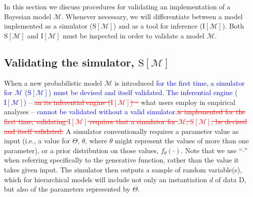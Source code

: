 \documentclass[oneside]{article}
\begin{document}
In this section we discuss procedures for validating an implementation of a Bayesian model $\mathcal{M}$.
Whenever necessary, we will differentiate between a model implemented as a simulator ($\text{S}[\mathcal{M}]$) and as a tool for inference ($\text{I}[\mathcal{M}]$).
Both $\text{S}[\mathcal{M}]$ and $\text{I}[\mathcal{M}]$ must be inspected in order to validate a model $\mathcal{M}$.

\subsection*{Validating the simulator, $\text{S}[\mathcal{M}]$}
\label{verify-correctness-of-simulator-implementation}

When a new probabilistic model $\mathcal{M}$ is introduced \textcolor{blue}{for the first time, a simulator for $\mathcal{M}$ ($\text{S}[\mathcal{M}]$) must be devised and itself validated.
The inferential engine ($\text{I}[\mathcal{M}]$) -- }\textcolor{red}{\st{an its inferential engine ($\text{I}[\mathcal{M}]$) -- }}what users employ in empirical analyses -- \textcolor{blue}{cannot be validated without a valid simulator.}\textcolor{red}{\st{is implemented for the first time, validating $\text{I}[\mathcal{M}]$ requires that a simulator for $\mathcal{M}$, $\text{S}[\mathcal{M}]$, be devised and itself validated.}}
A simulator conventionally requires a parameter value as input (i.e., a value for $\Theta$, $\theta$, where $\theta$ might represent the values of more than one parameter), or a prior distribution on those values, $f_{\theta}(\cdot)$. 
Note that we use ``$\cdot$'' when referring specifically to the generative function, rather than the value it takes given input.
The simulator then outputs a sample of random variable(s), which for hierarchical models will include not only an instantiation $d$ of data $\text{D}$, but also of the parameters represented by $\Theta$.
\end{document}
